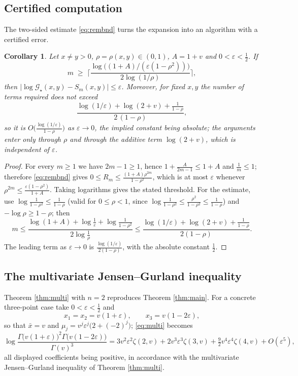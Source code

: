\documentclass[11pt,a4paper]{amsart}
\newtheorem{corollary}[theorem]{Corollary}
\theoremstyle{definition}
\newcommand{\Gs}{\mathcal{G}_{\star}}
\newcommand{\eps}{\varepsilon}
\begin{document}
\subsection{Certified computation}
The two-sided estimate \eqref{eq:rembnd} turns the expansion into an algorithm with a
certified error.

\begin{corollary}\label{cor:alg}
Let $x\ne y>0$, $\rho=\rho(x,y)\in(0,1)$, $A=1+v$ and $0<\eps<\tfrac12$. If
\[
  m\;\ge\;\Big\lceil\frac{\log\big((1+A)/(\eps(1-\rho^{2}))\big)}{2\log(1/\rho)}\Big\rceil ,
\]
then $\big|\log\Gs(x,y)-S_m(x,y)\big|\le\eps$. Moreover, for fixed $x,y$ the number of
terms required does not exceed
\[
  \frac{\log(1/\eps)+\log(2+v)+\frac{1}{1-\rho}}{2\,(1-\rho)},
\]
so it is $O\big(\frac{\log(1/\eps)}{1-\rho}\big)$ as $\eps\to0$, the implied constant
being absolute; the arguments enter only through $\rho$ and through the additive
term $\log(2+v)$, which is independent of $\eps$.
\end{corollary}

\begin{proof}
For every $m\ge1$ we have $2m-1\ge1$, hence $1+\frac{A}{2m-1}\le1+A$ and $\frac1m\le1$;
therefore \eqref{eq:rembnd} gives
$0\le R_m\le\frac{(1+A)\rho^{2m}}{1-\rho^{2}}$, which is at most $\eps$ whenever
$\rho^{2m}\le\frac{\eps(1-\rho^{2})}{1+A}$. Taking logarithms gives the stated threshold.
For the estimate, use $\log\frac{1}{1-\rho^{2}}\le\frac{1}{1-\rho}$ (valid for
$0\le\rho<1$, since $\log\frac1{1-\rho^2}\le\frac{\rho^2}{1-\rho^2}\le\frac1{1-\rho}$) and
$-\log\rho\ge1-\rho$; then
\[
  m\le\frac{\log(1+A)+\log\frac1\eps+\log\frac{1}{1-\rho^{2}}}{2\log\frac1\rho}
  \le\frac{\log(1/\eps)+\log(2+v)+\frac{1}{1-\rho}}{2(1-\rho)} .
\]
The leading term as $\eps\to0$ is $\frac{\log(1/\eps)}{2(1-\rho)}$, with the absolute
constant $\frac12$.
\end{proof}

\subsection{The multivariate Jensen--Gurland inequality}
Theorem \ref{thm:multi} with $n=2$ reproduces Theorem \ref{thm:main}. For a concrete
three-point case take $0<\eps<\tfrac12$ and
\[
  x_{1}=x_{2}=v(1+\eps),\qquad x_{3}=v(1-2\eps),
\]
so that $\bar x=v$ and $\mu_{j}=v^{j}\eps^{j}\big(2+(-2)^{j}\big)$; \eqref{eq:multi} becomes
\[
  \log\frac{\Gamma\big(v(1+\eps)\big)^{2}\Gamma\big(v(1-2\eps)\big)}{\Gamma(v)^{3}}
   =3v^{2}\eps^{2}\zeta(2,v)+2v^{3}\eps^{3}\zeta(3,v)
    +\tfrac92v^{4}\eps^{4}\zeta(4,v)+O(\eps^{5}),
\]
all displayed coefficients being positive, in accordance with the multivariate
Jensen--Gurland inequality of Theorem \ref{thm:multi}.
\end{document}
